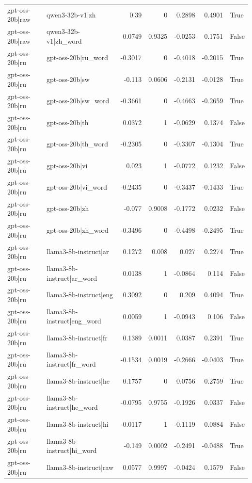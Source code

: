 \begin{table}
\begin{tabular}{l l r r r r l}
gpt-oss-20b|raw & qwen3-32b-v1|zh & 0.39 & 0 & 0.2898 & 0.4901 & True \\
gpt-oss-20b|raw & qwen3-32b-v1|zh_word & 0.0749 & 0.9325 & -0.0253 & 0.1751 & False \\
gpt-oss-20b|ru & gpt-oss-20b|ru_word & -0.3017 & 0 & -0.4018 & -0.2015 & True \\
gpt-oss-20b|ru & gpt-oss-20b|sw & -0.113 & 0.0606 & -0.2131 & -0.0128 & True \\
gpt-oss-20b|ru & gpt-oss-20b|sw_word & -0.3661 & 0 & -0.4663 & -0.2659 & True \\
gpt-oss-20b|ru & gpt-oss-20b|th & 0.0372 & 1 & -0.0629 & 0.1374 & False \\
gpt-oss-20b|ru & gpt-oss-20b|th_word & -0.2305 & 0 & -0.3307 & -0.1304 & True \\
gpt-oss-20b|ru & gpt-oss-20b|vi & 0.023 & 1 & -0.0772 & 0.1232 & False \\
gpt-oss-20b|ru & gpt-oss-20b|vi_word & -0.2435 & 0 & -0.3437 & -0.1433 & True \\
gpt-oss-20b|ru & gpt-oss-20b|zh & -0.077 & 0.9008 & -0.1772 & 0.0232 & False \\
gpt-oss-20b|ru & gpt-oss-20b|zh_word & -0.3496 & 0 & -0.4498 & -0.2495 & True \\
gpt-oss-20b|ru & llama3-8b-instruct|ar & 0.1272 & 0.008 & 0.027 & 0.2274 & True \\
gpt-oss-20b|ru & llama3-8b-instruct|ar_word & 0.0138 & 1 & -0.0864 & 0.114 & False \\
gpt-oss-20b|ru & llama3-8b-instruct|eng & 0.3092 & 0 & 0.209 & 0.4094 & True \\
gpt-oss-20b|ru & llama3-8b-instruct|eng_word & 0.0059 & 1 & -0.0943 & 0.106 & False \\
gpt-oss-20b|ru & llama3-8b-instruct|fr & 0.1389 & 0.0011 & 0.0387 & 0.2391 & True \\
gpt-oss-20b|ru & llama3-8b-instruct|fr_word & -0.1534 & 0.0019 & -0.2666 & -0.0403 & True \\
gpt-oss-20b|ru & llama3-8b-instruct|he & 0.1757 & 0 & 0.0756 & 0.2759 & True \\
gpt-oss-20b|ru & llama3-8b-instruct|he_word & -0.0795 & 0.9755 & -0.1926 & 0.0337 & False \\
gpt-oss-20b|ru & llama3-8b-instruct|hi & -0.0117 & 1 & -0.1119 & 0.0884 & False \\
gpt-oss-20b|ru & llama3-8b-instruct|hi_word & -0.149 & 0.0002 & -0.2491 & -0.0488 & True \\
gpt-oss-20b|ru & llama3-8b-instruct|raw & 0.0577 & 0.9997 & -0.0424 & 0.1579 & False \\

\end{tabular}
\end{table}
